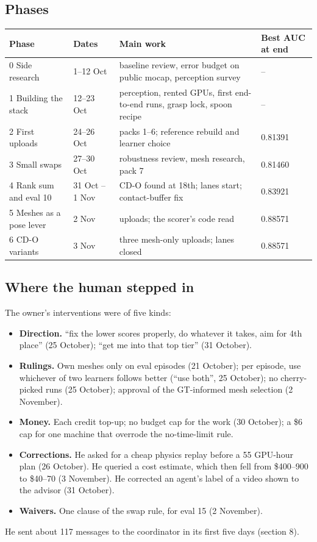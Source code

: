 \documentclass[11pt]{article}
\begin{document}
\subsection{Phases}
\begin{table}[tbp]
\centering\small
\begin{tabularx}{\linewidth}{ll>{\raggedright\arraybackslash}Xl}
\toprule
\textbf{Phase} & \textbf{Dates} & \textbf{Main work} & \textbf{Best AUC at end} \\
\midrule
0 Side research & 1–12 Oct & baseline review, error budget on public mocap, perception survey & – \\
1 Building the stack & 12–23 Oct & perception, rented GPUs, first end-to-end runs, grasp lock, spoon recipe & – \\
2 First uploads & 24–26 Oct & packs 1–6; reference rebuild and learner choice & 0.81391 \\
3 Small swaps & 27–30 Oct & robustness review, mesh research, pack 7 & 0.81460 \\
4 Rank sum and eval 10 & 31 Oct – 1 Nov & CD-O found at 18th; lanes start; contact-buffer fix & 0.83921 \\
5 Meshes as a pose lever & 2 Nov & 12 uploads; the scorer's code read & 0.88571 \\
6 CD-O variants & 3 Nov & three mesh-only uploads; lanes closed & 0.88571 \\
\bottomrule
\end{tabularx}
\end{table}
\subsection{Where the human stepped in}
The owner's interventions were of five kinds:

\begin{itemize}[itemsep=2pt,topsep=3pt]
\item \textbf{Direction.} ``fix the lower scores properly, do whatever it takes, aim for 4th place'' (25 October); ``get me into that top tier'' (31 October).
\item \textbf{Rulings.} Own meshes only on eval episodes (21 October); per episode, use whichever of two learners follows better (``use both'', 25 October); no cherry-picked runs (25 October); approval of the GT-informed mesh selection (2 November).
\item \textbf{Money.} Each credit top-up; no budget cap for the work (30 October); a \$6 cap for one machine that overrode the no-time-limit rule.
\item \textbf{Corrections.} He asked for a cheap physics replay before a 55 GPU-hour plan (26 October). He queried a cost estimate, which then fell from \$400–900 to \$40–70 (3 November). He corrected an agent's label of a video shown to the advisor (31 October).
\item \textbf{Waivers.} One clause of the swap rule, for eval 15 (2 November).
\end{itemize}
He sent about 117 messages to the coordinator in its first five days (section 8).
\end{document}
